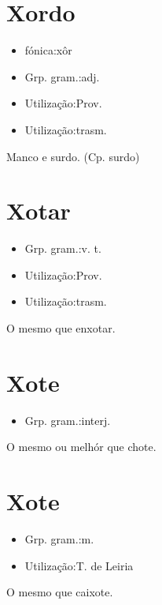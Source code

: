 \section{Xordo}
\begin{itemize}
\item {fónica:xôr}
\end{itemize}
\begin{itemize}
\item {Grp. gram.:adj.}
\end{itemize}
\begin{itemize}
\item {Utilização:Prov.}
\end{itemize}
\begin{itemize}
\item {Utilização:trasm.}
\end{itemize}
Manco e surdo.
(Cp. \textunderscore surdo\textunderscore )
\section{Xotar}
\begin{itemize}
\item {Grp. gram.:v. t.}
\end{itemize}
\begin{itemize}
\item {Utilização:Prov.}
\end{itemize}
\begin{itemize}
\item {Utilização:trasm.}
\end{itemize}
O mesmo que \textunderscore enxotar\textunderscore .
\section{Xote}
\begin{itemize}
\item {Grp. gram.:interj.}
\end{itemize}
O mesmo ou melhór que \textunderscore chote\textunderscore .
\section{Xote}
\begin{itemize}
\item {Grp. gram.:m.}
\end{itemize}
\begin{itemize}
\item {Utilização:T. de Leiria}
\end{itemize}
O mesmo que \textunderscore caixote\textunderscore .
